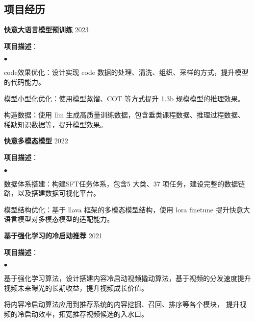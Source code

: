 \documentclass[margin,line]{res}
\newenvironment{list2}{
  \begin{list}{$\bullet$}{%
      \setlength{\itemsep}{0in}
      \setlength{\parsep}{0in} \setlength{\parskip}{0in}
      \setlength{\topsep}{0in} \setlength{\partopsep}{0in}
      \setlength{\leftmargin}{0.2in}}}{\end{list}}
\begin{document}
\begin{resume}
	\section{\sc 项目经历}
	\textbf{快意大语言模型预训练} \hfill{2023}
	\begin{description}
		\item \textbf{项目描述}：
		      \begin{list2}
			      \item code效果优化：设计实现 code 数据的处理、清洗、组织、采样的方式，提升模型的代码能力。
			      \item 模型小型化优化：使用模型蒸馏、COT 等方式提升 1.3b 规模模型的推理效果。
			      \item 构造数据：使用 llm 生成高质量训练数据，包含垂类课程数据、推理过程数据、稀缺知识数据等，提升模型效果。
		      \end{list2}
	\end{description}

	\textbf{快意多模态模型} \hfill{2022}
	\begin{description}
		\item \textbf{项目描述}：
		      \begin{list2}
			      \item 数据体系搭建：构建SFT任务体系，包含5 大类、37 项任务，建设完整的数据链路，以及搭建数据可视化平台。
			      \item 模型结构优化：基于 llava 框架的多模态模型结构，使用 lora finetune 提升快意大语言模型对多模态模型的适配能力。
		      \end{list2}
	\end{description}

	\textbf{基于强化学习的冷启动推荐} \hfill{2021}
	\begin{description}
		\item \textbf{项目描述}：
		      \begin{list2}
			      \item 基于强化学习算法，设计搭建内容冷启动视频撬动算法，基于视频的分发速度提升视频未来曝光的长期收益，提升视频成长价值。
			      \item 将内容冷启动算法应用到推荐系统的内容挖掘、召回、排序等各个模块， 提升视频的冷启动效率，拓宽推荐视频候选的入水口。
		      \end{list2}
	\end{description}


\end{resume}
\end{document}
